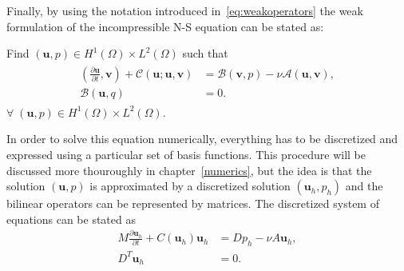 Finally, by using the notation introduced in~\ref{eq:weakoperators} the weak formulation of the incompressible
N-S equation can be stated as: 

Find $(\mathbf{u}, p) \in H^1(\Omega)\times L^2(\Omega)$ such that 
\begin{align}
    \begin{split}
        (\frac{\partial \mathbf{u}}{\partial t},\mathbf{v})
        + \mathcal{C}(\mathbf{u};\mathbf{u},\mathbf{v})
        &= \mathcal{B}(\mathbf{v},p) 
        -\nu\mathcal{A}(\mathbf{u},\mathbf{v}), \\
        \mathcal{B}(\mathbf{u},q) &= 0.
    \end{split}
	\label{eq:NSweak}
\end{align}
$\forall\; (\mathbf{u}, p) \in H^1(\Omega)\times L^2(\Omega)$.
%

In order to solve this equation numerically, everything has to be discretized and expressed 
using a particular set of basis functions. This procedure will be discussed more thouroughly
in chapter~\ref{numerics}, but the idea is that the solution $(\mathbf{u},p)$ is approximated 
by a discretized solution $(\mathbf{u}_h,p_h)$ and the bilinear operators can be represented 
by matrices. The discretized system of equations can be stated as
%
\begin{align}
    M\frac{\partial \mathbf{u}_h}{\partial t} +C(\mathbf{u}_h)\mathbf{u}_h &= Dp_h-\nu A\mathbf{u}_h,\\
    D^T\mathbf{u}_h &= 0.
    \label{eq:NSMatrixform}
\end{align}
%
